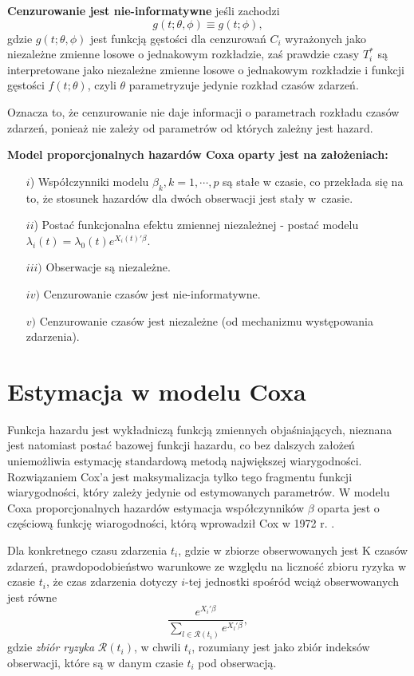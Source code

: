 \begin{definition}
\textbf{Cenzurowanie jest nie-informatywne} jeśli zachodzi
\begin{equation}\label{nieinf}
g(t;\theta, \phi) \equiv g(t;\phi),
\end{equation}
gdzie $g(t;\theta, \phi)$ jest funkcją gęstości dla cenzurowań $C_i$ wyrażonych jako niezależne zmienne losowe o jednakowym rozkładzie, zaś prawdzie czasy $T^*_i$ są interpretowane jako niezależne zmienne losowe o jednakowym rozkładzie i funkcji gęstości $f(t;\theta)$, czyli $\theta$ parametryzuje jedynie rozkład czasów zdarzeń.
\end{definition}

Oznacza to, że cenzurowanie nie daje informacji o parametrach rozkładu czasów zdarzeń, ponieaż nie zależy od parametrów od których zależny jest hazard.

\textbf{Model proporcjonalnych hazardów Coxa oparty jest na założeniach:}
\begin{enumerate}
\item[$i$)] Współczynniki modelu $\beta_k, k = 1,\cdots,p$ są stałe w czasie, co przekłada się na to, że stosunek hazardów dla dwóch obserwacji jest stały w~czasie.
\item[$ii$)] Postać funkcjonalna efektu zmiennej niezależnej - postać modelu $\lambda_i(t) = \lambda_0(t)e^{X_i(t)'\beta}$.
\item[$iii)$] Obserwacje są niezależne.
\item[$iv)$] Cenzurowanie czasów jest nie-informatywne.
\item[$v)$] Cenzurowanie czasów jest niezależne (od mechanizmu występowania zdarzenia).
\end{enumerate}

\section{Estymacja w modelu Coxa}

Funkcja hazardu jest wykładniczą funkcją zmiennych objaśniających, nieznana jest natomiast
postać bazowej funkcji hazardu, co bez dalszych założeń uniemożliwia estymację standardową
metodą największej wiarygodności. Rozwiązaniem Cox’a jest maksymalizacja tylko tego fragmentu funkcji wiarygodności, który zależy jedynie od estymowanych parametrów. W modelu Coxa proporcjonalnych hazardów estymacja współczynników $\beta$ oparta jest o częściową funkcję wiarogodności, którą wprowadził Cox w 1972 r. \cite{cox}. 

Dla konkretnego czasu zdarzenia $t_i$, gdzie w zbiorze obserwowanych jest K czasów zdarzeń, prawdopodobieństwo warunkowe ze względu na liczność zbioru ryzyka w czasie $t_i$, że czas zdarzenia dotyczy $i$-tej jednostki spośród wciąż obserwowanych jest równe
\begin{equation}
\dfrac{e^{X_i'\beta}}{\sum\limits_{l\in \mathscr{R}(t_i)}^{}e^{X_l'\beta}},
\end{equation}
gdzie \textit{zbiór ryzyka} $\mathscr{R}(t_i)$, w chwili $t_i$, rozumiany jest jako zbiór indeksów obserwacji, które są w danym czasie $t_i$ pod obserwacją.

